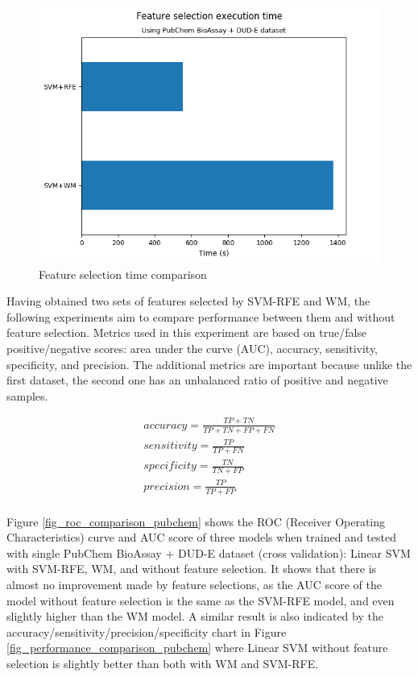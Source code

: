 \documentclass[conference,compsoc,12pt]{IEEEtran}
\begin{document}
	\begin{figure}
		\includegraphics[scale=0.5]{../images/feature_selection_time_comparison.png}
		\caption{Feature selection time comparison}
		\label{fig_feature_selection_time_comparison}
	\end{figure}
		
	Having obtained two sets of features selected by SVM-RFE and WM, the following experiments aim to compare performance between them and without feature selection. Metrics used in this experiment are based on true/false positive/negative scores: area under the curve (AUC), accuracy, sensitivity, specificity, and precision. The additional metrics are important because unlike the first dataset, the second one has an unbalanced ratio of positive and negative samples.

	\begin{align}
	accuracy = \frac{TP + TN}{TP + TN + FP + FN} \\
	sensitivity = \frac{TP}{TP + FN} \\	
	specificity = \frac{TN}{TN + FP} \\		
	precision = \frac{TP}{TP + FP} \\			
	\label{eq_performance_metrics}
	\end{align}

	Figure \ref{fig_roc_comparison_pubchem} shows the ROC (Receiver Operating Characteristics) curve and AUC score of three models when trained and tested with single PubChem BioAssay + DUD-E dataset (cross validation): Linear SVM with SVM-RFE, WM, and without feature selection. It shows that there is almost no improvement made by feature selections, as the AUC score of the model without feature selection is the same as the SVM-RFE model, and even slightly higher than the WM model. A similar result is also indicated by the accuracy/sensitivity/precision/specificity chart in Figure \ref{fig_performance_comparison_pubchem} where Linear SVM without feature selection is slightly better than both with WM and SVM-RFE.
		
\end{document}
